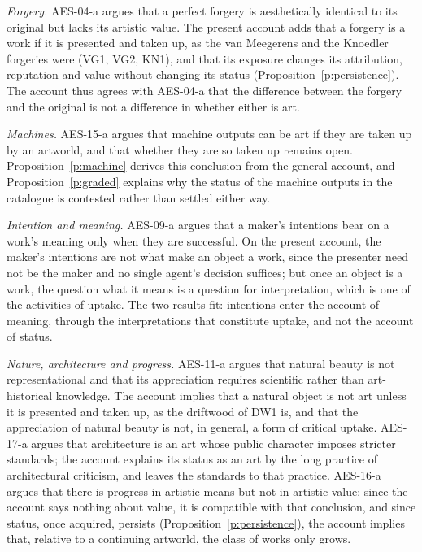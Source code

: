 \documentclass{situationist-preprint}
\begin{document}
\emph{Forgery.} AES-04-a argues that a perfect forgery is aesthetically identical to its original but lacks its artistic value. The present account adds that a forgery is a work if it is presented and taken up, as the van Meegerens and the Knoedler forgeries were (VG1, VG2, KN1), and that its exposure changes its attribution, reputation and value without changing its status (Proposition~\ref{p:persistence}). The account thus agrees with AES-04-a that the difference between the forgery and the original is not a difference in whether either is art.

\emph{Machines.} AES-15-a argues that machine outputs can be art if they are taken up by an artworld, and that whether they are so taken up remains open. Proposition~\ref{p:machine} derives this conclusion from the general account, and Proposition~\ref{p:graded} explains why the status of the machine outputs in the catalogue is contested rather than settled either way.

\emph{Intention and meaning.} AES-09-a argues that a maker's intentions bear on a work's meaning only when they are successful. On the present account, the maker's intentions are not what make an object a work, since the presenter need not be the maker and no single agent's decision suffices; but once an object is a work, the question what it means is a question for interpretation, which is one of the activities of uptake. The two results fit: intentions enter the account of meaning, through the interpretations that constitute uptake, and not the account of status.

\emph{Nature, architecture and progress.} AES-11-a argues that natural beauty is not representational and that its appreciation requires scientific rather than art-historical knowledge. The account implies that a natural object is not art unless it is presented and taken up, as the driftwood of DW1 is, and that the appreciation of natural beauty is not, in general, a form of critical uptake. AES-17-a argues that architecture is an art whose public character imposes stricter standards; the account explains its status as an art by the long practice of architectural criticism, and leaves the standards to that practice. AES-16-a argues that there is progress in artistic means but not in artistic value; since the account says nothing about value, it is compatible with that conclusion, and since status, once acquired, persists (Proposition~\ref{p:persistence}), the account implies that, relative to a continuing artworld, the class of works only grows.
\end{document}

